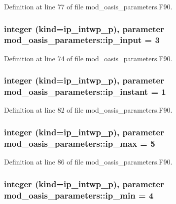Definition at line 77 of file mod\+\_\+oasis\+\_\+parameters.\+F90.

\hypertarget{classmod__oasis__parameters_a6a7bcd0e3a33573729f94098ecd9a922}{
\subsubsection[{ip\+\_\+input}]{\setlength{\rightskip}{0pt plus 5cm}integer (kind=ip\+\_\+intwp\+\_\+p), parameter mod\+\_\+oasis\+\_\+parameters\+::ip\+\_\+input = 3}}\label{classmod__oasis__parameters_a6a7bcd0e3a33573729f94098ecd9a922}


Definition at line 74 of file mod\+\_\+oasis\+\_\+parameters.\+F90.

\hypertarget{classmod__oasis__parameters_a1028581caadcb9d7506b25c6cd3efd01}{
\subsubsection[{ip\+\_\+instant}]{\setlength{\rightskip}{0pt plus 5cm}integer (kind=ip\+\_\+intwp\+\_\+p), parameter mod\+\_\+oasis\+\_\+parameters\+::ip\+\_\+instant = 1}}\label{classmod__oasis__parameters_a1028581caadcb9d7506b25c6cd3efd01}


Definition at line 82 of file mod\+\_\+oasis\+\_\+parameters.\+F90.

\hypertarget{classmod__oasis__parameters_abe7b7d586b50bd7c7d77c7834efa2801}{
\subsubsection[{ip\+\_\+max}]{\setlength{\rightskip}{0pt plus 5cm}integer (kind=ip\+\_\+intwp\+\_\+p), parameter mod\+\_\+oasis\+\_\+parameters\+::ip\+\_\+max = 5}}\label{classmod__oasis__parameters_abe7b7d586b50bd7c7d77c7834efa2801}


Definition at line 86 of file mod\+\_\+oasis\+\_\+parameters.\+F90.

\hypertarget{classmod__oasis__parameters_a194cfc3b7f2d515492e04fd6e8931c60}{
\subsubsection[{ip\+\_\+min}]{\setlength{\rightskip}{0pt plus 5cm}integer (kind=ip\+\_\+intwp\+\_\+p), parameter mod\+\_\+oasis\+\_\+parameters\+::ip\+\_\+min = 4}}\label{classmod__oasis__parameters_a194cfc3b7f2d515492e04fd6e8931c60}


